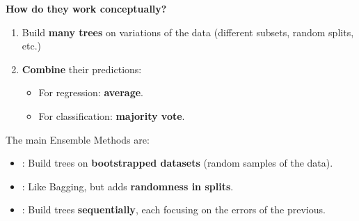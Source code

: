 \highspace
\begin{flushleft}
    \textcolor{Green3}{ \textbf{How do they work conceptually?}}
\end{flushleft}
\begin{enumerate}
    \item Build \textbf{many trees} on variations of the data (different subsets, random splits, etc.)
    \item \textbf{Combine} their predictions:
    \begin{itemize}
        \item For regression: \textbf{average}.
        \item For classification: \textbf{majority vote}.
    \end{itemize}
\end{enumerate}
The main Ensemble Methods are:
\begin{itemize}
    \item {}: Build trees on \textbf{bootstrapped datasets} (random samples of the data).
    \item {}: Like Bagging, but adds \textbf{randomness in splits}.
    \item {}: Build trees \textbf{sequentially}, each focusing on the errors of the previous.
\end{itemize}